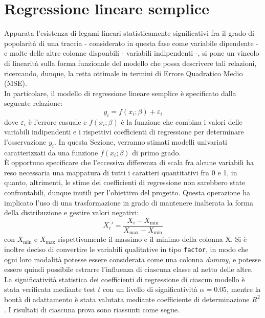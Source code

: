 \documentclass[fleqn,10pt]{SelfArx} %
\begin{document}
\section{Regressione lineare semplice}
Appurata l’esistenza di legami lineari statisticamente significativi fra il grado di popolarità di una traccia - considerato in questa fase come variabile dipendente - e molte delle altre colonne disponbili - variabili indipendenti -, si pone un vincolo di linearità sulla forma funzionale del modello che possa descrivere tali relazioni, ricercando, dunque, la retta ottimale in termini di Errore Quadratico Medio (MSE).\\
In particolare, il modello di regressione lineare semplice è specificato dalla seguente relazione:
\begin{equation}
    y_i=f(x_i;β)+ε_i
\end{equation}
dove $ε_i$ è l'errore casuale e $f(x_i;β)$ è la funzione che combina i valori delle variabili indipendenti e i rispettivi coefficienti di regressione per determinare l'osservazione $y_i$. In questa Sezione, verranno stimati modelli univariati caratterizzati da una funzione $f(x_i;β)$ di primo grado.\\
È opportuno specificare che l'eccessiva differenza di scala fra alcune variabili ha reso necessaria una mappatura di tutti i caratteri quantitativi fra 0 e 1, in quanto, altrimenti, le stime dei coefficienti di regressione non sarebbero state confrontabili, dunque inutili per l'obiettivo del progetto. Questa operazione ha implicato l'uso di una trasformazione in grado di mantenere inalterata la forma della distribuzione e gestire valori negativi:
\begin{equation}
    X_i'=\frac{X_i-X_{\text{min}}}{X_{\text{max}}-X_{\text{min}}}
\end{equation}
con $X_{\text{min}}$ e $X_{\text{max}}$ rispettivamente il massimo e il minimo della colonna X. Si è inoltre deciso di convertire le variabili qualitative in tipo \texttt{factor}, in modo che ogni loro modalità potesse essere considerata come una colonna \textit{dummy}, e potesse essere quindi possibile estrarre l'influenza di ciascuna classe al netto delle altre.\\
La significatività statistica dei coefficienti di regressione di ciascun modello è stata verificata mediante test $t$ con un livello di significatività $\alpha=0.05$, mentre la bontà di adattamento è stata valutata mediante coefficiente di determinazione $R^2$.
I risultati di ciascuna prova sono riassunti come segue.
\end{document}

